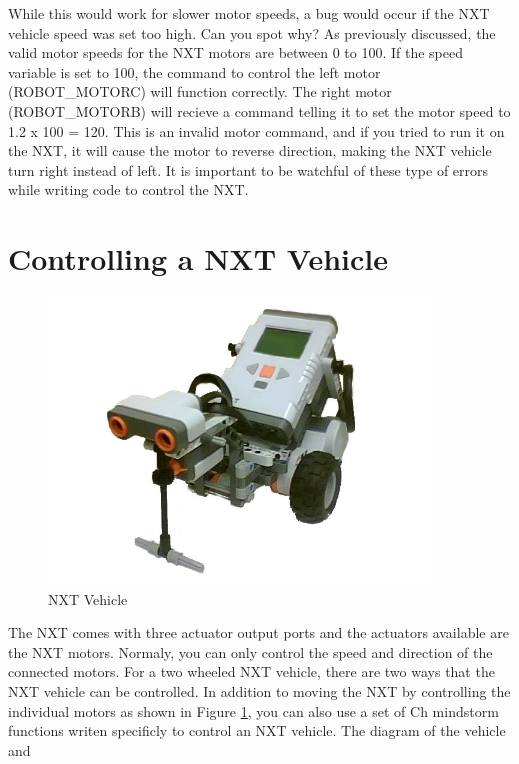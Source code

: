 \noindent
While this would work for slower motor speeds, a bug would occur if the NXT vehicle speed was 
set too high. Can you spot why? As previously discussed, the valid motor speeds for the NXT 
motors are between 0 to 100. If the speed variable is set to 100, the command to control 
the left motor (ROBOT\_MOTORC) will function correctly.  The right motor (ROBOT\_MOTORB) will recieve
a command telling it to set the motor speed to 1.2 x 100 = 120. This is an invalid motor 
command, and if you tried to run it on the NXT, it will cause the motor to reverse direction, 
making the NXT vehicle turn right instead of left. It is important to be watchful of these 
type of errors while writing code to control the NXT.\\
\newpage
\section{Controlling a NXT Vehicle}
\begin{figure}[h!]
  \begin{center}
    \includegraphics[height=3in]{figure/mindstorm/NXT_vehicle.png}
    \caption{NXT Vehicle\label{fig_NXT_vehicle}}
  \end{center}
\end{figure}
\noindent
The NXT comes with three actuator output ports and the actuators available are the NXT motors. 
Normaly, you can only control the speed and direction of the connected motors. For a two wheeled NXT 
vehicle, there are two ways that the NXT vehicle can be controlled.  In addition to moving the NXT by
controlling the individual motors as shown in Figure \ref{fig_NXT_vehicle}, you can also use a set of
Ch mindstorm functions writen specificly to control an NXT vehicle. The diagram of the vehicle and 
